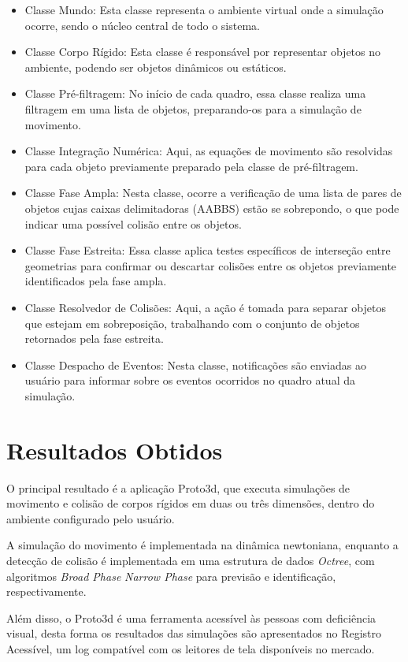 \documentclass[12pt]{article}
\begin{document}
\begin{itemize}
\item Classe Mundo: Esta classe representa o ambiente virtual onde a simulação ocorre, sendo o núcleo central de todo o sistema.
\item Classe Corpo Rígido: Esta classe é responsável por representar objetos no ambiente, podendo ser objetos dinâmicos ou estáticos.
\item Classe Pré-filtragem: No início de cada quadro, essa classe realiza uma filtragem em uma lista de objetos, preparando-os para a simulação de movimento.
\item Classe Integração Numérica: Aqui, as equações de movimento são resolvidas para cada objeto previamente preparado pela classe de pré-filtragem.
\item Classe Fase Ampla: Nesta classe, ocorre a verificação de uma lista de pares de objetos cujas caixas delimitadoras (AABBS) estão se sobrepondo, o que pode indicar uma possível colisão entre os objetos.
\item Classe Fase Estreita: Essa classe aplica testes específicos de interseção entre geometrias para confirmar ou descartar colisões entre os objetos previamente identificados pela fase ampla.
\item Classe Resolvedor de Colisões: Aqui, a ação é tomada para separar objetos que estejam em sobreposição, trabalhando com o conjunto de objetos retornados pela fase estreita.
\item Classe Despacho de Eventos: Nesta classe, notificações são enviadas ao usuário para informar sobre os eventos ocorridos no quadro atual da simulação.
\end{itemize}

\section{Resultados Obtidos}
O principal resultado é a aplicação Proto3d, que executa simulações de movimento e colisão de corpos rígidos em duas ou três dimensões, dentro do ambiente configurado pelo usuário. 

A simulação do movimento é implementada na dinâmica newtoniana, enquanto a detecção de colisão é implementada em uma estrutura de dados \emph{Octree}, com algoritmos \emph{Broad Phase} \emph{Narrow Phase} para previsão e identificação, respectivamente.

Além disso, o Proto3d é uma ferramenta acessível às pessoas com deficiência visual, desta forma os resultados das simulações são apresentados no Registro Acessível, um log compatível com os leitores de tela disponíveis no mercado.
\end{document}
